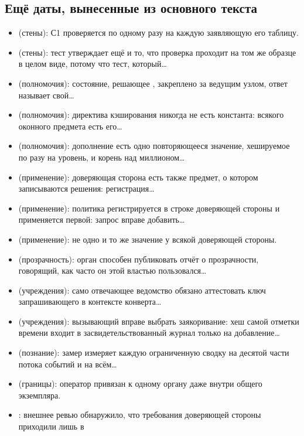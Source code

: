 \subsection*{Ещё даты, вынесенные из основного текста}

\begin{itemize}
  \item {} (стены): С1 проверяется по одному разу на каждую заявляющую его таблицу.
  \item {} (стены): тест утверждает ещё и то, что проверка проходит на том же образце в
    целом виде, потому что тест, который\ldots
  \item {} (полномочия): состояние, решающее , закреплено за ведущим узлом,
    ответ называет свой\ldots
  \item {} (полномочия): директива кэширования никогда не есть константа:
     всякого оконного предмета есть его\ldots
  \item {} (полномочия): дополнение есть одно повторяющееся значение, хешируемое по разу
    на уровень, и корень над миллионом\ldots
  \item {} (применение): доверяющая сторона есть также предмет, о котором записываются
    решения: регистрация\ldots
  \item {} (применение): политика регистрируется в строке доверяющей стороны и
    применяется первой: запрос вправе добавить\ldots
  \item {} (применение): не одно и то же значение у всякой доверяющей стороны.
  \item {} (прозрачность): орган способен публиковать отчёт о прозрачности, говорящий,
    как часто он этой властью пользовался\ldots
  \item {} (учреждения): само отвечающее ведомство обязано аттестовать ключ
    запрашивающего в контексте конверта\ldots
  \item {} (учреждения): вызывающий вправе выбрать заякоривание: хеш самой отметки
    времени входит в засвидетельствованный журнал только на добавление\ldots
  \item {} (познание): замер измеряет каждую ограниченную сводку на десятой части потока
    событий и на всём\ldots
  \item {} (границы): оператор привязан к одному органу даже внутри общего экземпляра.
  \item {}: внешнее ревью обнаружило, что требования доверяющей стороны приходили лишь в

\end{itemize}
